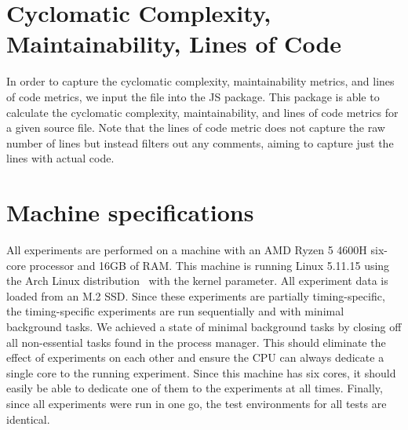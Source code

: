 \section{Cyclomatic Complexity, Maintainability, Lines of Code}
In order to capture the cyclomatic complexity, maintainability metrics, and lines of code metrics, we input the file into the  JS package. This package is able to calculate the cyclomatic complexity, maintainability, and lines of code metrics for a given source file. Note that the lines of code metric does not capture the raw number of lines but instead filters out any comments, aiming to capture just the lines with actual code.

\section{Machine specifications}\label{sec:experimental-setup:machine-specs}
All experiments are performed on a machine with an AMD Ryzen 5 4600H six-core processor and 16GB of RAM. This machine is running Linux 5.11.15 using the Arch Linux distribution~ with the  kernel parameter. All experiment data is loaded from an M.2 SSD. Since these experiments are partially timing-specific, the timing-specific experiments are run sequentially and with minimal background tasks. We achieved a state of minimal background tasks by closing off all non-essential tasks found in the process manager. This should eliminate the effect of experiments on each other and ensure the CPU can always dedicate a single core to the running experiment. Since this machine has six cores, it should easily be able to dedicate one of them to the experiments at all times. Finally, since all experiments were run in one go, the test environments for all tests are identical.

